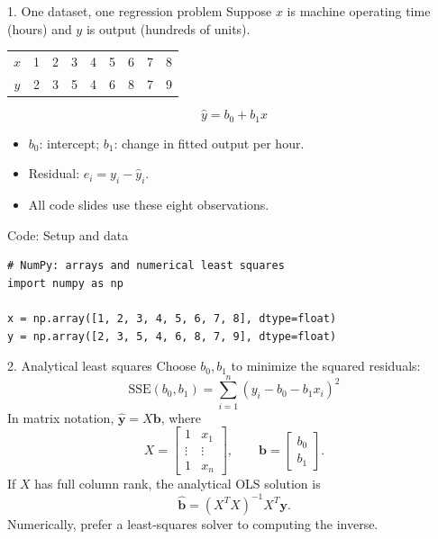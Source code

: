 \documentclass[aspectratio=43,11pt]{beamer}
\begin{document}
\begin{frame}{1. One dataset, one regression problem}
\small
Suppose $x$ is machine operating time (hours) and $y$ is output (hundreds of units).
\begin{center}
\begin{tabular}{c|rrrrrrrr}
\toprule
$x$ & 1 & 2 & 3 & 4 & 5 & 6 & 7 & 8 \\
$y$ & 2 & 3 & 5 & 4 & 6 & 8 & 7 & 9 \\
\bottomrule
\end{tabular}
\end{center}
\[
\boxed{\widehat y=b_0+b_1x}
\]
\begin{itemize}
\item $b_0$: intercept; $b_1$: change in fitted output per hour.
\item Residual: $e_i=y_i-\widehat y_i$.
\item All code slides use these eight observations.
\end{itemize}
\end{frame}

\begin{frame}[fragile]{Code: Setup and data}
\small
\color{maroon}
\begin{verbatim}
# NumPy: arrays and numerical least squares
import numpy as np

x = np.array([1, 2, 3, 4, 5, 6, 7, 8], dtype=float)
y = np.array([2, 3, 5, 4, 6, 8, 7, 9], dtype=float)
\end{verbatim}
\end{frame}

\begin{frame}{2. Analytical least squares}
\small
Choose $b_0,b_1$ to minimize the squared residuals:
\[
\boxed{\mathrm{SSE}(b_0,b_1)=\sum_{i=1}^n(y_i-b_0-b_1x_i)^2}
\]
In matrix notation, $\widehat{\mathbf y}=X\mathbf b$, where
\[
X=\begin{bmatrix}1&x_1\\\vdots&\vdots\\1&x_n\end{bmatrix},\qquad
\mathbf b=\begin{bmatrix}b_0\\b_1\end{bmatrix}.
\]
If $X$ has full column rank, the analytical OLS solution is
\[
\boxed{\widehat{\mathbf b}=(X^TX)^{-1}X^T\mathbf y}.
\]
Numerically, prefer a least-squares solver to computing the inverse.
\end{frame}
\end{document}
